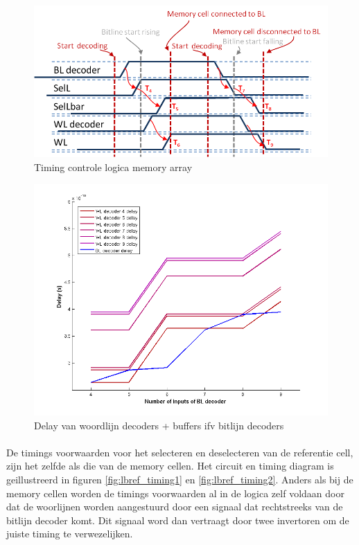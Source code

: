 \begin{figure}[!ht]
  \centering
  \includegraphics[scale=0.9]{../fig/hfdstk-timing-lbcell2.png}
  \caption{Timing controle logica memory array}
  \label{fig:lbcell_timing2}
\end{figure}

\begin{figure}[!ht]
  \centering
  \includegraphics[scale=0.6]{../fig/hfdstk-timing-decoder-dep.png}
  \caption{Delay van woordlijn decoders + buffers ifv bitlijn decoders}
  \label{fig:decoder_dep}
\end{figure}

\paragraph{}
De timings voorwaarden voor het selecteren en deselecteren van de referentie cell, zijn het zelfde als die van de memory cellen. Het circuit en timing diagram is geillustreerd in figuren \ref{fig:lbref_timing1} en \ref{fig:lbref_timing2}. Anders als bij de memory cellen worden de timings voorwaarden al in de logica zelf voldaan door dat de woorlijnen worden aangestuurd door een signaal dat rechtstreeks van de bitlijn decoder komt. Dit signaal word dan vertraagt door twee invertoren om de juiste timing te verwezelijken.


